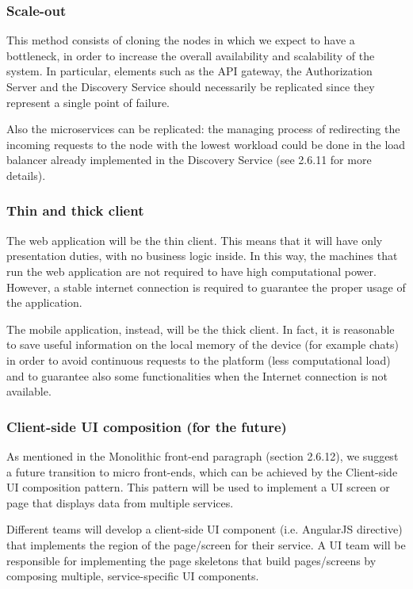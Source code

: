 
\subsubsection{Scale-out}
This method consists of cloning the nodes in which we expect to have a bottleneck, in order to increase the overall availability and scalability of the system. In particular, elements such as the API gateway, the Authorization Server and the Discovery Service should necessarily  be replicated since they represent a single point of failure. 

Also the microservices can be replicated: the managing process of redirecting the incoming requests to the node with the lowest workload could be done in the load balancer already implemented in the Discovery Service (see 2.6.11 for more details).

\subsubsection{Thin and thick client}
The web application will be the thin client. This means that it will have only presentation duties, with no business logic inside. In this way, the machines that run the web application are not required to have high computational power. However, a stable internet connection is required to guarantee the proper usage of the application.

The mobile application, instead, will be the thick client. In fact, it is reasonable to save useful information on the local memory of the device (for example chats) in order to avoid continuous requests to the platform (less computational load) and to guarantee also some functionalities when the Internet connection is not available.

\subsubsection{Client-side UI composition (for the future)}
As mentioned in the Monolithic front-end paragraph (section 2.6.12), we suggest a future transition to micro front-ends, which can be achieved by the Client-side UI composition pattern. This pattern will be used to implement a UI screen or page that displays data from multiple services. 

Different teams will develop a client-side UI component (i.e. AngularJS directive) that implements the region of the page/screen for their service. A UI team will be responsible for implementing the page skeletons that build pages/screens by composing multiple, service-specific UI components.


